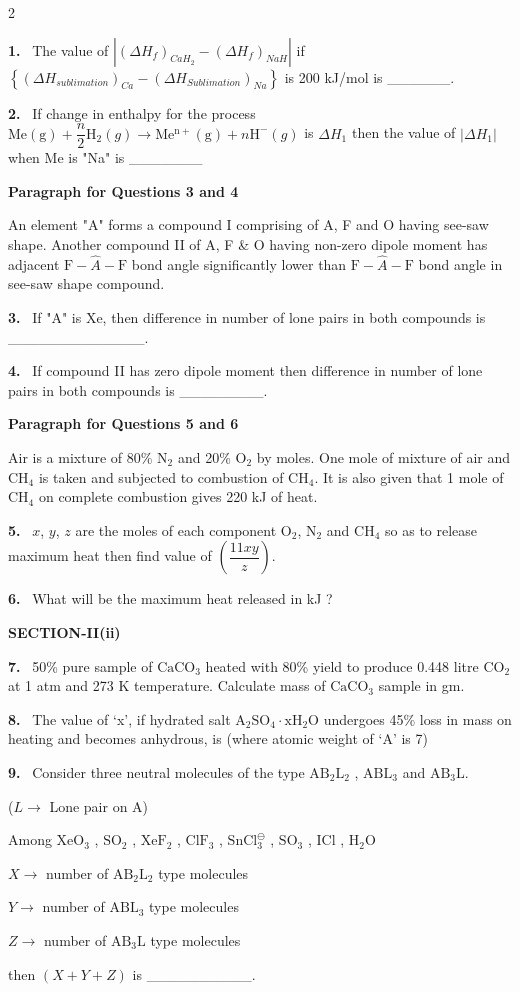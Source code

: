 \documentclass[10pt]{extarticle}
\newcommand{\sect}[1]{\par\smallskip\noindent\textbf{#1}\par}
\newcommand{\qn}[1]{\par\smallskip\noindent\textbf{#1.}~}
\newcommand{\paraq}[2]{\par\smallskip\noindent\textbf{Paragraph for Questions #1 and #2}\par}
\begin{document}
\begin{multicols}{2}
\qn{1} The value of $\left|\left(\Delta H_f\right)_{CaH_2}-\left(\Delta H_f\right)_{NaH}\right|$ if $\left\{\left(\Delta H_{sublimation}\right)_{Ca}-\left(\Delta H_{Sublimation}\right)_{Na}\right\}$ is 200 kJ/mol is \_\_\_\_\_\_.
\qn{2} If change in enthalpy for the process $\mathrm{Me(g)}+\dfrac n2\mathrm H_2(g)\to\mathrm{Me^{n+}(g)}+n\mathrm H^-(g)$ is $\Delta H_1$ then the value of $|\Delta H_1|$ when Me is "Na" is \_\_\_\_\_\_\_
\paraq{3}{4}
An element "A" forms a compound I comprising of A, F and O having see-saw shape. Another compound II of A, F \& O having non-zero dipole moment has adjacent $\mathrm F-\hat A-\mathrm F$ bond angle significantly lower than $\mathrm F-\hat A-\mathrm F$ bond angle in see-saw shape compound.
\qn{3} If "A" is Xe, then difference in number of lone pairs in both compounds is \_\_\_\_\_\_\_\_\_\_\_\_\_.
\qn{4} If compound II has zero dipole moment then difference in number of lone pairs in both compounds is \_\_\_\_\_\_\_\_.
\paraq{5}{6}
Air is a mixture of 80\% $\mathrm{N_2}$ and 20\% $\mathrm{O_2}$ by moles. One mole of mixture of air and $\mathrm{CH_4}$ is taken and subjected to combustion of $\mathrm{CH_4}$. It is also given that 1 mole of $\mathrm{CH_4}$ on complete combustion gives 220 kJ of heat.
\qn{5} $x$, $y$, $z$ are the moles of each component $\mathrm{O_2}$, $\mathrm{N_2}$ and $\mathrm{CH_4}$ so as to release maximum heat then find value of $\left(\dfrac{11xy}z\right)$.
\qn{6} What will be the maximum heat released in kJ ?
\sect{SECTION-II(ii)}
\qn{7} 50\% pure sample of $\mathrm{CaCO_3}$ heated with 80\% yield to produce 0.448 litre $\mathrm{CO_2}$ at 1 atm and 273 K temperature. Calculate mass of $\mathrm{CaCO_3}$ sample in gm.
\qn{8} The value of `x', if hydrated salt $\mathrm{A_2SO_4\cdot xH_2O}$ undergoes 45\% loss in mass on heating and becomes anhydrous, is (where atomic weight of `A' is 7)
\qn{9} Consider three neutral molecules of the type $\mathrm{AB_2L_2}$ , $\mathrm{ABL_3}$ and $\mathrm{AB_3L}$.\par
($L\to$ Lone pair on A)\par
Among $\mathrm{XeO_3}$ , $\mathrm{SO_2}$ , $\mathrm{XeF_2}$ , $\mathrm{ClF_3}$ , $\mathrm{SnCl_3^{\ominus}}$ , $\mathrm{SO_3}$ , $\mathrm{ICl}$ , $\mathrm{H_2O}$\par
$X\to$ number of $\mathrm{AB_2L_2}$ type molecules\par
$Y\to$ number of $\mathrm{ABL_3}$ type molecules\par
$Z\to$ number of $\mathrm{AB_3L}$ type molecules\par
then $(X+Y+Z)$ is \_\_\_\_\_\_\_\_\_\_.

\end{multicols}
\end{document}
